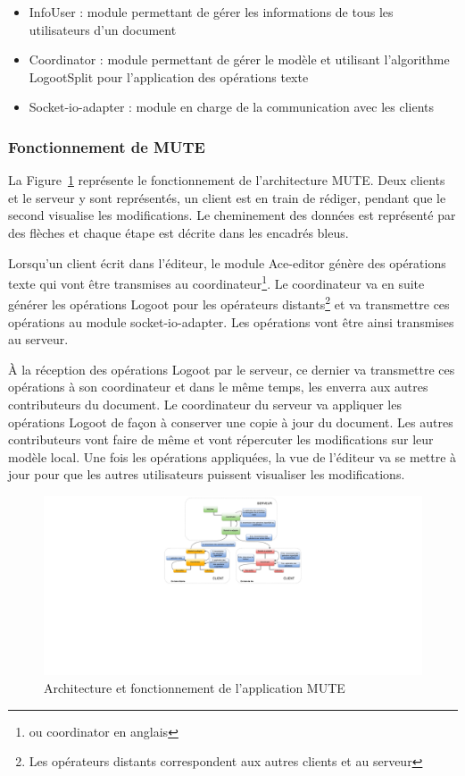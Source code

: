 \documentclass{tnreport}
\begin{document}
\begin{itemize}
\item InfoUser : module permettant de gérer les informations de tous les utilisateurs d'un document
\item Coordinator : module permettant de gérer le modèle et utilisant l'algorithme LogootSplit pour l'application des opérations texte
\item Socket-io-adapter : module en charge de la communication avec les clients
\end{itemize}

\subsubsection{Fonctionnement de MUTE}

La Figure~\ref{fig:mute-archi} représente le fonctionnement de l'architecture MUTE. Deux clients et le serveur y sont représentés, un client est en train de rédiger, pendant que le second visualise les modifications. Le cheminement des données est représenté par des flèches et chaque étape est décrite dans les encadrés bleus.

Lorsqu'un client écrit dans l'éditeur, le module Ace-editor génère des opérations texte qui vont être transmises au coordinateur\footnote{ou coordinator en anglais}. Le coordinateur va en suite générer les opérations Logoot pour les opérateurs distants\footnote{Les opérateurs distants correspondent aux autres clients et au serveur} et va transmettre ces opérations au module socket-io-adapter. Les opérations vont être ainsi transmises au serveur.

À la réception des opérations Logoot par le serveur, ce dernier va transmettre ces opérations à son coordinateur et dans le même temps, les enverra aux autres contributeurs du document. Le coordinateur du serveur va appliquer les opérations Logoot de façon à conserver une copie à jour du document. Les autres contributeurs vont faire de même et vont répercuter les modifications sur leur modèle local. Une fois les opérations appliquées, la vue de l'éditeur va se mettre à jour pour que les autres utilisateurs puissent visualiser les modifications.

\begin{figure}[!h]
  \centering
  \includegraphics[width=17cm]{figures/MUTE-archi}
  \caption{Architecture et fonctionnement de l'application MUTE}
  \label{fig:mute-archi}
\end{figure}
\end{document}
